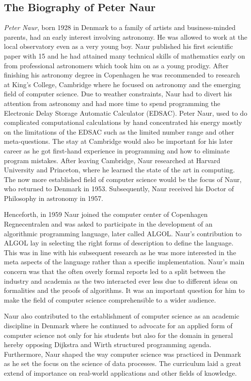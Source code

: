 \documentclass{article}
\begin{document}
\subsection{The Biography of Peter Naur}
\textit{Peter Naur}, born 1928 in Denmark to a family of artists and business-minded parents, had an early interest involving astronomy. He was allowed to work at the local observatory even as a very young boy. Naur published his first scientific paper with 15 and he had attained many technical skills of mathematics early on from professional astronomers which took him on as a young prodigy. After finishing his astronomy degree in Copenhagen he was recommended to research at King's College, Cambridge where he focused on astronomy and the emerging field of computer science. Due to weather constraints, Naur had to divert his attention from astronomy and had more time to spend programming the Electronic Delay Storage Automatic Calculator (EDSAC). Peter Naur, used to do complicated computational calculations by hand concentrated his energy mostly on the limitations of the EDSAC such as the limited number range and other meta-questions. The stay at Cambridge would also be important for his later career as he got first-hand experience in programming and how to eliminate program mistakes. After leaving Cambridge, Naur researched at Harvard University and Princeton, where he learned the state of the art in computing. The now more established field of computer science would be the focus of Naur, who returned to Denmark in 1953. Subsequently, Naur received his Doctor of Philosophy in astronomy in 1957.

Henceforth, in 1959 Naur joined the computer center of Copenhagen Regnecentralen and was asked to participate in the development of an algorithmic programming language, later called ALGOL. Naur's contribution to ALGOL lay in selecting the right forms of description to define the language. This was in line with his subsequent research as he was more interested in the meta aspects of the language rather than a specific implementation. Naur's main concern was that the often overly formal reports led to a split between the industry and academia as the two interacted ever less due to different ideas on formalities and the proofs of algorithms. It was an important question for him to make the field of computer science comprehensible to a wider audience.

Naur also contributed to the establishment of computer science as an academic discipline in Denmark where he continued to advocate for an applied form of computer science not only for his students but also for the domain in general hereby opposing Dijkstra and Wirth structured programming agenda. Furthermore, Naur shaped the way computer science was practiced in Denmark as he set the focus on the science of data processes. The curriculum laid a great extend of importance on real-world applications and other fields of knowledge.
\end{document}
